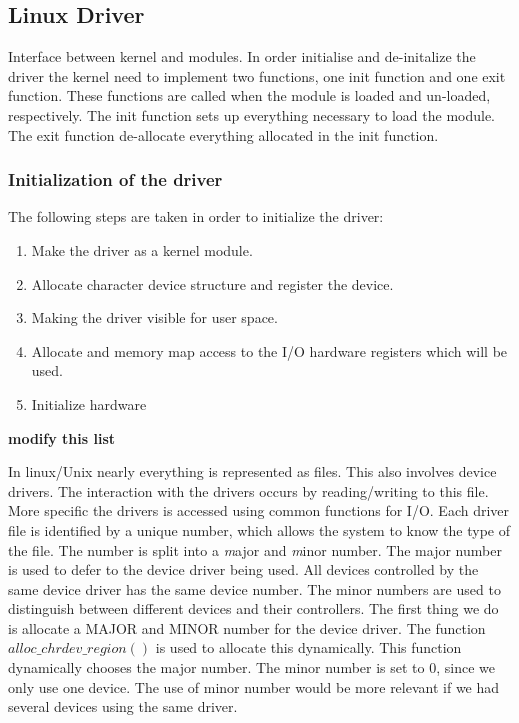 \subsection{Linux Driver}
Interface between kernel and modules. In order initialise and de-initalize the driver the kernel need to implement two functions, one init function and one exit function. These functions are called when the module is loaded and un-loaded, respectively. The init function sets up everything necessary to load the module. The exit function de-allocate everything allocated in the init function. 


\subsubsection{Initialization of the driver}

The following steps are taken in order to initialize the driver:

\begin{enumerate}
    \item Make the driver as a kernel module.
    \item Allocate character device structure and register the device. 
    \item Making the driver visible for user space.
    \item Allocate and memory map access to the I/O hardware registers which will be used. 
    \item Initialize hardware
\end{enumerate}

{\bf modify this list}

In linux/Unix nearly everything is represented as files. This also involves device drivers. The interaction with the drivers occurs by reading/writing to this file. More specific the drivers is accessed  using common functions for I/O. Each driver file is identified by a unique number, which allows the system to know the type of the file. The number is split into a \emph major and \emph minor number. The major number is used to defer to the device driver being used. All devices controlled by the same device driver has the same device number. The minor numbers are used to distinguish between different devices and their controllers. The first thing we do is allocate a MAJOR and MINOR number for the device driver. The function $alloc\_chrdev\_region()$ is used to allocate this dynamically. This function dynamically chooses the major number. The minor number is set to 0, since we only use one device. The use of minor number would be more relevant if we had several devices using the same driver. 

